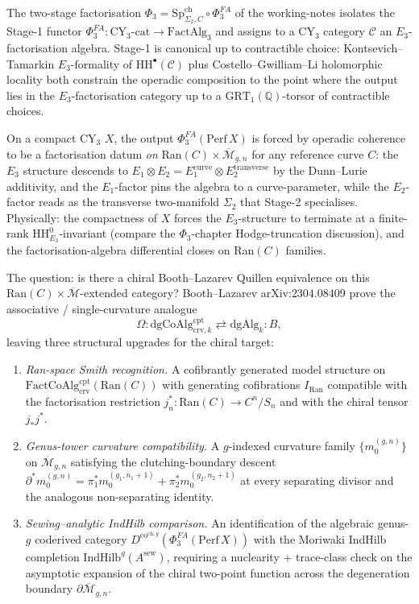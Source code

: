 \documentclass[11pt]{amsart}
\newcommand{\cC}{\mathcal{C}}
\newcommand{\Ran}{\mathrm{Ran}}
\newcommand{\FactCoAlg}{\mathrm{FactCoAlg}}
\newcommand{\crv}{\mathrm{crv}}
\newcommand{\cpt}{\mathrm{cpt}}
\newcommand{\dgAlg}{\mathrm{dgAlg}}
\newcommand{\dgCoAlg}{\mathrm{dgCoAlg}}
\newcommand{\Dco}{D^{\mathrm{co}}}
\newcommand{\IndHilb}{\mathrm{IndHilb}}
\newcommand{\Mbar}{\overline{\mathcal{M}}}
\newcommand{\Perf}{\mathrm{Perf}}
\newcommand{\HH}{\mathrm{HH}}
\newcommand{\bQ}{\mathbb{Q}}
\begin{document}
The two-stage factorisation $\Phi_3 = \mathrm{Sp}^{\mathrm{ch}}_{\Sigma_2,C}
\circ \Phi^{FA}_3$ of the working-notes isolates the Stage-1 functor
$\Phi^{FA}_3 : \mathrm{CY}_3\text{-cat} \to \mathrm{FactAlg}_3$ and
assigns to a CY$_3$ category $\cC$ an $E_3$-factorisation algebra.
Stage-1 is canonical up to contractible choice: Kontsevich--Tamarkin
$E_3$-formality of $\HH^\bullet(\cC)$ plus Costello--Gwilliam--Li
holomorphic locality both constrain the operadic composition to the
point where the output lies in the $E_3$-factorisation category up to
a $\mathrm{GRT}_1(\bQ)$-torsor of contractible choices.

On a compact CY$_3$ $X$, the output $\Phi^{FA}_3(\Perf\,X)$ is forced
by operadic coherence to be a factorisation datum \emph{on} $\Ran(C)
\times \Mbar_{g,n}$ for any reference curve $C$: the $E_3$ structure
descends to $E_1 \otimes E_2 = E_1^{\mathrm{curve}} \otimes
E_2^{\mathrm{transverse}}$ by the Dunn--Lurie additivity, and the
$E_1$-factor pins the algebra to a curve-parameter, while the
$E_2$-factor reads as the transverse two-manifold $\Sigma_2$ that
Stage-2 specialises. Physically: the compactness of $X$ forces the
$E_3$-structure to terminate at a finite-rank $\HH^0_{E_3}$-invariant
(compare the $\Phi_3$-chapter Hodge-truncation discussion), and the
factorisation-algebra differential closes on Ran$(C)$ families.

The question: is there a chiral Booth--Lazarev Quillen equivalence
on this $\Ran(C)\times\Mbar$-extended category? Booth--Lazarev
arXiv:$2304.08409$ prove the associative / single-curvature analogue
\[
\Omega : \dgCoAlg^{\cpt}_{\crv,k} \rightleftarrows \dgAlg_k : B,
\]
leaving three structural upgrades for the chiral target:
\begin{enumerate}[label=\textup{(}$\mathbf{O}_\arabic*^{\mathrm{BL}}$\textup{)}, leftmargin=2.5em]
\item \emph{Ran-space Smith recognition.} A cofibrantly generated
model structure on $\FactCoAlg^{\cpt}_{\crv}(\Ran(C))$ with
generating cofibrations $I_{\Ran}$ compatible with the factorisation
restriction $j^*_n : \Ran(C) \to C^n/S_n$ and with the chiral tensor
$j_\ast j^\ast$.
\item \emph{Genus-tower curvature compatibility.} A $g$-indexed
curvature family $\{m_0^{(g,n)}\}$ on $\Mbar_{g,n}$ satisfying the
clutching-boundary descent
$\partial^* m_0^{(g,n)} = \pi_1^* m_0^{(g_1,n_1+1)} + \pi_2^*
m_0^{(g_2,n_2+1)}$ at every separating divisor and the analogous
non-separating identity.
\item \emph{Sewing--analytic IndHilb comparison.} An identification of
the algebraic genus-$g$ coderived category
$\Dco^{\mathrm{ch},g}(\Phi^{FA}_3(\Perf\,X))$ with the Moriwaki
IndHilb completion $\IndHilb^g(A^{\mathrm{sew}})$, requiring a
nuclearity + trace-class check on the asymptotic expansion of the
chiral two-point function across the degeneration boundary
$\partial\Mbar_{g,n}$.
\end{enumerate}
\end{document}
